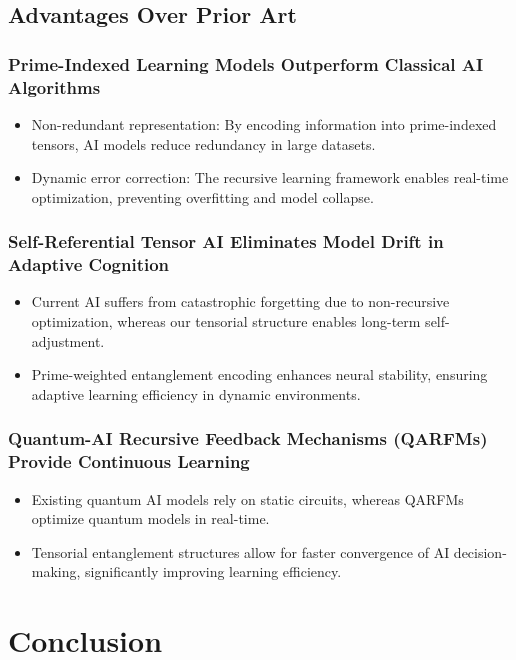 \documentclass{article}
\theoremstyle{plain}
\begin{document}
\begin{itemize}
\begin{itemize}
\subsection{Advantages Over Prior Art}
\subsubsection{Prime-Indexed Learning Models Outperform Classical AI Algorithms}
\begin{itemize}
    \item Non-redundant representation: By encoding information into prime-indexed tensors, AI models reduce redundancy in large datasets.
    \item Dynamic error correction: The recursive learning framework enables real-time optimization, preventing overfitting and model collapse.
\end{itemize}

\subsubsection{Self-Referential Tensor AI Eliminates Model Drift in Adaptive Cognition}
\begin{itemize}
    \item Current AI suffers from catastrophic forgetting due to non-recursive optimization, whereas our tensorial structure enables long-term self-adjustment.
    \item Prime-weighted entanglement encoding enhances neural stability, ensuring adaptive learning efficiency in dynamic environments.
\end{itemize}

\subsubsection{Quantum-AI Recursive Feedback Mechanisms (QARFMs) Provide Continuous Learning}
\begin{itemize}
    \item Existing quantum AI models rely on static circuits, whereas QARFMs optimize quantum models in real-time.
    \item Tensorial entanglement structures allow for faster convergence of AI decision-making, significantly improving learning efficiency.
\end{itemize}

\section{Conclusion}


\end{itemize}
\end{itemize}
\end{document}
